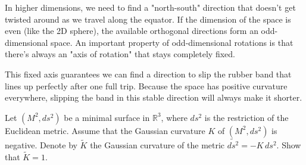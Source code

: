 \begin{solution}
In higher dimensions, we need to find a "north-south" direction that doesn't get twisted around as we travel along the equator. If the dimension of the space is even (like the 2D sphere), the available orthogonal directions form an odd-dimensional space. An important property of odd-dimensional rotations is that there's always an "axis of rotation" that stays completely fixed. 

This fixed axis guarantees we can find a direction to slip the rubber band that lines up perfectly after one full trip. Because the space has positive curvature everywhere, slipping the band in this stable direction will always make it shorter.
\end{solution}

\begin{exercise}
\label{geometry:2013:6}
Let $(M^{2}, ds^{2})$ be a minimal surface in $\mathbb{R}^{3}$, where $ds^{2}$ is the restriction of the Euclidean metric. Assume that the Gaussian curvature $K$ of $(M^{2}, ds^{2})$ is negative. Denote by $\widetilde{K}$ the Gaussian curvature of the metric $\widetilde{ds^{2}} = -K\, ds^{2}$. Show that $\widetilde{K} = 1$.
\end{exercise}

